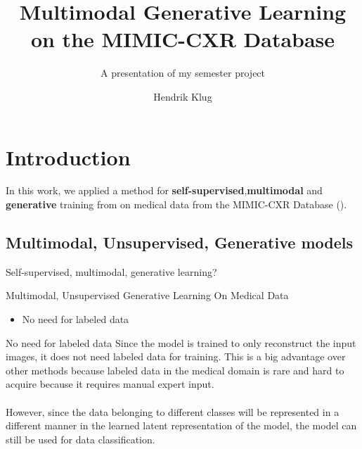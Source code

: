 

\title{Multimodal Generative Learning on the MIMIC-CXR Database}
\subtitle{A presentation of my semester project}
\author{Hendrik Klug}

    \begin{frame}
        \titlepage
    \end{frame}


    \section{Introduction}

    \begin{frame}
        In this work, we applied a method for \textbf{self-supervised},\textbf{multimodal} and \textbf{generative} training from \cite{thomas_multimodal} on medical data from the MIMIC-CXR Database (\cite{johnson2019mimic}).
    \end{frame}

    \subsection{Multimodal, Unsupervised, Generative models}
    \begin{frame}{Self-supervised, multimodal, generative learning?}
    \end{frame}

    \begin{frame}{Multimodal, Unsupervised Generative Learning On Medical Data}
        \begin{itemize}
            \item No need for labeled data
        \end{itemize}
    \end{frame}
    
    \begin{frame}{No need for labeled data}
    Since the model is trained to only reconstruct the input images, it does not need labeled data for training.
    This is a big advantage over other methods because labeled data in the medical domain is rare and hard to acquire because it requires manual expert input.\\
    \\
    \pause
    However, since the data belonging to different classes will be represented in a different manner in the learned latent representation of the model, the model can still be used for data classification.
        
    \end{frame}
    
